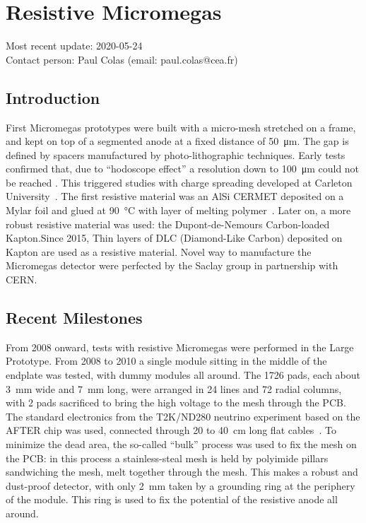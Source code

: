 \section{Resistive Micromegas}
\label{chap:TPC_sec:micromegas}
Most recent update: 2020-05-24\\
Contact person: Paul Colas (email: paul.colas@cea.fr)\\

\subsection{Introduction}
First Micromegas prototypes were built with a micro-mesh stretched on a frame, and kept on top of
a segmented anode at a fixed distance of \SI{50}{\micro \meter}. The gap is defined by spacers manufactured
by photo-lithographic techniques. Early tests confirmed that, due to ``hodoscope effect'' a resolution
down to \SI{100}{\micro \meter} could not be reached \cite{Arogancia:2007pt}. This triggered studies with charge spreading
developed at Carleton University~\cite{Dixit:2003qg}.
The first resistive material was an AlSi CERMET deposited on a Mylar foil and glued at
\SI{90}{\degreeCelsius} with layer of melting polymer~\cite{2007NIMPA.581..254D}. Later on, a more robust resistive material was
used: the Dupont-de-Nemours Carbon-loaded Kapton.Since 2015, Thin layers of DLC (Diamond-Like Carbon) deposited on Kapton are used as a resistive material. 
Novel way to manufacture the Micromegas detector
were perfected by the Saclay group in partnership with CERN.


\subsection{Recent Milestones}
From 2008 onward, tests with resistive Micromegas were performed in the Large Prototype. From 2008 to 2010
a single module sitting in the middle of the endplate was tested, with dummy modules all around. The 1726 pads, each about \SI{3}{mm} wide
and \SI{7}{mm} long,
were arranged in 24 lines and 72 radial columns, with 2 pads sacrificed to bring the high voltage to the mesh
through the PCB. The standard electronics from the T2K/ND280 neutrino experiment based on the AFTER chip
was used, connected through 20 to \SI{40}{cm} long flat cables~\cite{6418152}.
To minimize the dead area, the so-called ``bulk'' \cite{Giomataris:2004aa} process was used to fix the
mesh on the PCB: in this process a stainless-steal mesh is held by polyimide pillars sandwiching the mesh, melt together
through the mesh. This makes a robust and dust-proof detector, with only \SI{2}
{mm} taken by a grounding ring at the periphery of the module. This ring is used to fix the potential of the resistive anode all around.

